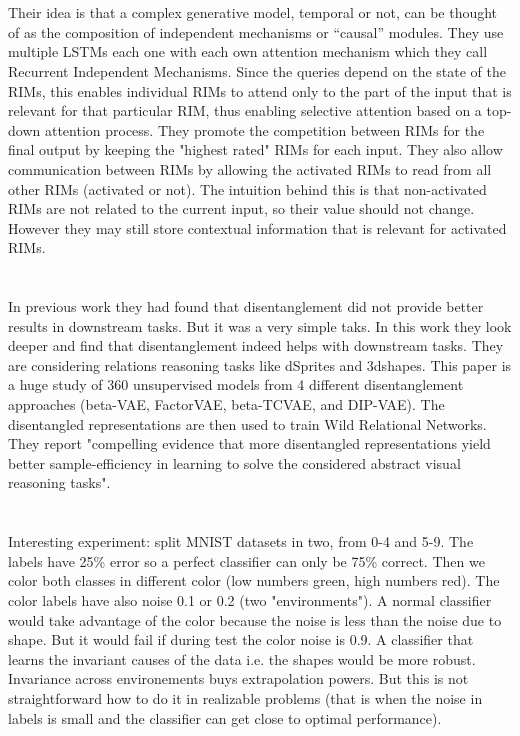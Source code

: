 \documentclass{article}
\newcommand{\citeall}[1]{\citeauthor{#1}}
\begin{document}
\section{\citeall{Goyal2019RecurrentMechanisms}}

Their idea is that a complex generative model, temporal or not, can be thought of as the composition of independent mechanisms or “causal” modules. They use multiple LSTMs each one with each own attention mechanism which they call Recurrent Independent Mechanisms. Since the queries depend on the state of the RIMs, this enables individual RIMs to attend only to the part of the input that is relevant for that particular RIM, thus enabling selective attention based on a top-down attention process. They promote the competition between RIMs for the final output by keeping the "highest rated" RIMs for each input. They also allow communication between RIMs by allowing the activated RIMs to read from all other RIMs (activated or not). The intuition behind this is that non-activated RIMs are not related to the current input, so their value should not change. However they may still store contextual information that is relevant for activated RIMs. 

\section{\citeall{VanSteenkiste2019AreReasoning}}

In previous work \cite{Locatello2018ChallengingRepresentations} they had found that disentanglement did not provide better results in downstream tasks. But it was a very simple taks. In this work they look deeper and find that disentanglement indeed helps with downstream tasks. They are considering relations reasoning tasks like dSprites and 3dshapes. This paper is a huge study of 360 unsupervised models from 4 different disentanglement approaches (beta-VAE, FactorVAE, beta-TCVAE, and DIP-VAE). The disentangled representations are then used to train Wild Relational Networks. They report "compelling evidence that more disentangled representations yield better sample-efficiency in learning to solve the considered abstract visual reasoning tasks".

\section{\citeall{Arjovsky2019InvariantMinimization}}

Interesting experiment: split MNIST datasets in two, from 0-4 and 5-9. The labels have 25\% error so a perfect classifier can only be 75\% correct. Then we color both classes in different color (low numbers green, high numbers red). The color labels have also noise 0.1 or 0.2 (two "environments"). A normal classifier would take advantage of the color because the noise is less than the noise due to shape. But it would fail if during test the color noise is 0.9. A classifier that learns the invariant causes of the data i.e. the shapes would be more robust. Invariance across environements buys extrapolation powers. But this is not straightforward how to do it in realizable problems (that is when the noise in labels is small and the classifier can get close to optimal performance). 
\end{document}
